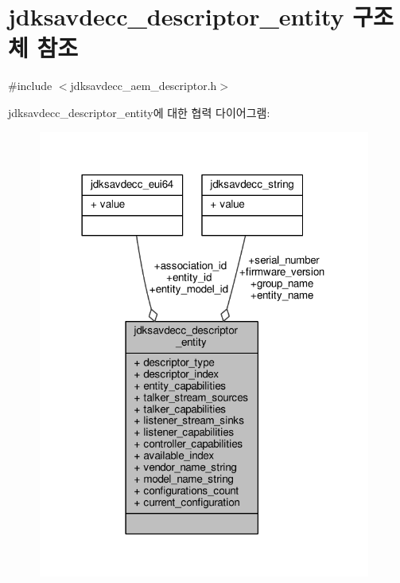 \hypertarget{structjdksavdecc__descriptor__entity}{}\section{jdksavdecc\+\_\+descriptor\+\_\+entity 구조체 참조}
\label{structjdksavdecc__descriptor__entity}


{\ttfamily \#include $<$jdksavdecc\+\_\+aem\+\_\+descriptor.\+h$>$}



jdksavdecc\+\_\+descriptor\+\_\+entity에 대한 협력 다이어그램\+:
\nopagebreak
\begin{figure}[H]
\begin{center}
\leavevmode
\includegraphics[width=310pt]{structjdksavdecc__descriptor__entity__coll__graph}
\end{center}
\end{figure}
